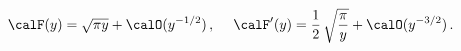 \begin{equation}
 \calF(y)=\sqrt{\pi y}+\calO(y^{-1/2})\,, \hspace{3ex}
 \calF'(y)=\frac{1}{2}\,\sqrt{\frac{\pi}{y}}+\calO(y^{-3/2})\,.
 \label{asympN0}
\end{equation}

